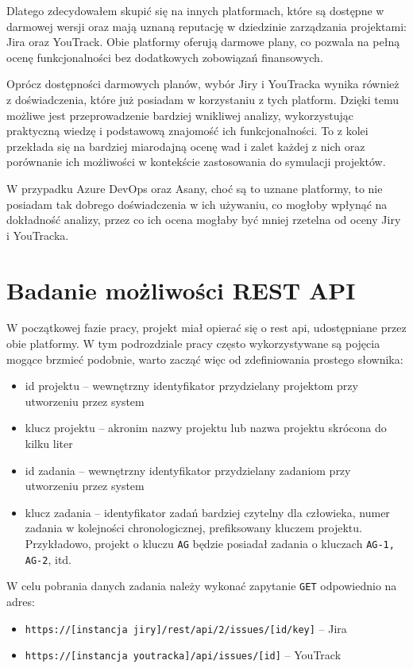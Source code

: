 Dlatego zdecydowałem skupić się na innych platformach, które są dostępne w darmowej wersji oraz mają uznaną reputację w dziedzinie zarządzania projektami: Jira oraz YouTrack. Obie platformy oferują darmowe plany, co pozwala na pełną ocenę
funkcjonalności bez dodatkowych zobowiązań finansowych.

Oprócz dostępności darmowych planów, wybór Jiry i YouTracka wynika również z doświadczenia, które już posiadam w korzystaniu z tych platform. Dzięki temu możliwe jest przeprowadzenie bardziej wnikliwej analizy, wykorzystując praktyczną
wiedzę i podstawową znajomość ich funkcjonalności. To z kolei przekłada się na bardziej miarodajną ocenę wad i zalet każdej z nich oraz porównanie ich możliwości w kontekście zastosowania do symulacji projektów.

W przypadku Azure DevOps oraz Asany, choć są to uznane platformy, to nie posiadam tak dobrego doświadczenia w ich używaniu, co mogłoby wpłynąć na dokładność analizy, przez co ich ocena mogłaby być mniej rzetelna od oceny Jiry i YouTracka.

\section{Badanie możliwości REST API}
W początkowej fazie pracy, projekt miał opierać się o rest api, udostępniane przez obie platformy. \cite{JiraApiDocumentation} \cite{YouTrackApiDocumentation}
W tym podrozdziale pracy często wykorzystywane są pojęcia mogące brzmieć podobnie, warto zacząć więc od zdefiniowania prostego słownika:
\begin{itemize}
    \item id projektu -- wewnętrzny identyfikator przydzielany projektom przy utworzeniu przez system
    \item klucz projektu -- akronim nazwy projektu lub nazwa projektu skrócona do kilku liter
    \item id zadania -- wewnętrzny identyfikator przydzielany zadaniom przy utworzeniu przez system
    \item klucz zadania -- identyfikator zadań bardziej czytelny dla człowieka, numer zadania w kolejności chronologicznej, prefiksowany kluczem projektu.
    Przykładowo, projekt o kluczu \texttt{AG} będzie posiadał zadania o kluczach \texttt{AG-1, AG-2}, itd.
\end{itemize}

W celu pobrania danych zadania należy wykonać zapytanie \texttt{GET} odpowiednio na adres:
\begin{itemize}
    \item \texttt{https://[instancja jiry]/rest/api/2/issues/[id/key]} -- Jira
    \item \texttt{https://[instancja youtracka]/api/issues/[id]} -- YouTrack
\end{itemize}

